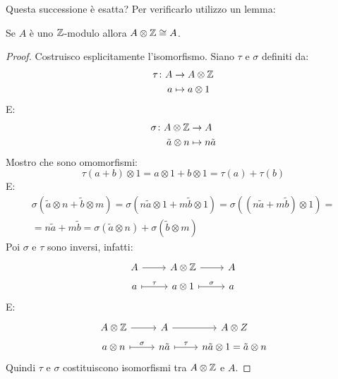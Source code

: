 Questa successione è esatta? Per verificarlo utilizzo un lemma:
\begin{lemma}
  Se $ A $ è uno $ \mathbb{Z} $-modulo allora $ A \otimes \mathbb{Z} \cong A $.
\end{lemma}
\begin{proof}
  Costruisco esplicitamente l'isomorfismo. Siano $ \tau $ e $ \sigma $ definiti da:
  \begin{align*}
    \tau \colon A & \to A \otimes \mathbb{Z} \\
    a & \mapsto a \otimes 1
  \end{align*}
  E:
  \begin{align*}
    \sigma \colon A \otimes \mathbb{Z} & \to A \\
    \tilde{a} \otimes n & \mapsto n \tilde{a}
  \end{align*}
  Mostro che sono omomorfismi:
  \[
    \tau(a + b) \otimes 1 = a \otimes 1 + b \otimes 1 = \tau(a) + \tau(b)
  \]
  E:
  \begin{gather*}
    \sigma(\tilde{a} \otimes n + \tilde{b} \otimes m ) = \sigma(n \tilde{a} \otimes 1 + m \tilde{b} \otimes
    1) = \sigma ((n \tilde{a} + m\tilde{b}) \otimes 1) = \\ = n \tilde{a} + m \tilde{b} =
    \sigma(\tilde{a} \otimes n) + \sigma(\tilde{b} \otimes m)
  \end{gather*}
  Poi $ \sigma $ e $ \tau $ sono inversi, infatti:
  \[
    \begin{tikzcd}[nodes={row sep = 5 pt}]
      A \rar{} & A \otimes \Z \rar & A \\
      a \arrow[mapsto]{r}{\tau} & a \otimes 1 \arrow[mapsto]{r}{\sigma} & a
    \end{tikzcd}
  \]
  E:
  \[
    \begin{tikzcd}[nodes={row sep = 5 pt}]
      A \otimes \Z \rar & A \rar & A \otimes Z \\
      a \otimes n \arrow[mapsto]{r}{\sigma} & n \tilde{a} \arrow[mapsto]{r}{\tau} & n \tilde{a} \otimes 1 = \tilde{a} \otimes n
    \end{tikzcd}
  \]
  Quindi $ \tau $ e $ \sigma $ costituiscono isomorfismi tra $ A \otimes \mathbb{Z} $ e $ A $.
\end{proof}

